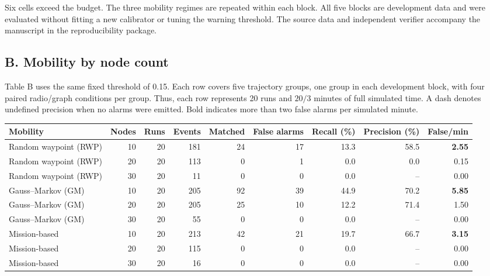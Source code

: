\documentclass[10pt,a4paper]{article}
\begin{document}
\noindent Six cells exceed the budget. The three mobility regimes are repeated within each block. All five blocks are development data and were evaluated without fitting a new calibrator or tuning the warning threshold. The source data and independent verifier accompany the manuscript in the reproducibility package.

\subsection*{B. Mobility by node count}
\noindent Table B uses the same fixed threshold of 0.15. Each row covers five trajectory groups, one group in each development block, with four paired radio/graph conditions per group. Thus, each row represents 20 runs and \(20/3\) minutes of full simulated time. A dash denotes undefined precision when no alarms were emitted. Bold indicates more than two false alarms per simulated minute.

\begin{center}
\small
\setlength{\tabcolsep}{3.2pt}
\begin{adjustbox}{max width=\linewidth}\begin{tabular}{lrrrrrrrr}
\toprule
Mobility & Nodes & Runs & Events & Matched & False alarms & Recall (\%) & Precision (\%) & False/min \\
\midrule
Random waypoint (RWP) & 10 & 20 & 181 & 24 & 17 & 13.3 & 58.5 & \textbf{2.55} \\
Random waypoint (RWP) & 20 & 20 & 113 & 0 & 1 & 0.0 & 0.0 & 0.15 \\
Random waypoint (RWP) & 30 & 20 & 11 & 0 & 0 & 0.0 & -- & 0.00 \\
Gauss--Markov (GM) & 10 & 20 & 205 & 92 & 39 & 44.9 & 70.2 & \textbf{5.85} \\
Gauss--Markov (GM) & 20 & 20 & 205 & 25 & 10 & 12.2 & 71.4 & 1.50 \\
Gauss--Markov (GM) & 30 & 20 & 55 & 0 & 0 & 0.0 & -- & 0.00 \\
Mission-based & 10 & 20 & 213 & 42 & 21 & 19.7 & 66.7 & \textbf{3.15} \\
Mission-based & 20 & 20 & 115 & 0 & 0 & 0.0 & -- & 0.00 \\
Mission-based & 30 & 20 & 16 & 0 & 0 & 0.0 & -- & 0.00 \\
\bottomrule
\end{tabular}\end{adjustbox}
\end{center}
\end{document}
